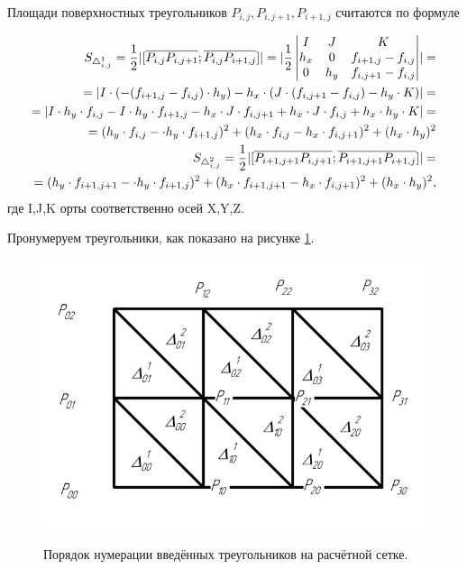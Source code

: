 \documentclass{article}
\begin{document}
Площади поверхностных треугольников $P_{i,j}, P_{i,j+1}, P_{i+1,j}$ считаются по формуле 

\begin{align}\label{eq:triangle_square}
S_{\triangle_{i,j}^1} = \frac{1}{2} \lvert [\overline{P_{i,j}P_{i,j+1}};\overline{P_{i,j}P_{i+1,j}}] \rvert = \lvert \frac{1}{2} 
\begin{vmatrix}
  I & J & K \\
  h_x & 0 & f_{i+1,j}-f_{i,j} \\
  0 & h_y & f_{i,j+1}-f_{i,j}
\end{vmatrix}
\rvert
= \notag \\
= \lvert I \cdot (-(f_{i+1,j}-f_{i,j}) \cdot h_y) - h_x \cdot (J \cdot (f_{i,j+1}-f_{i,j}) - h_y \cdot K) \rvert = \notag \\
= \lvert I \cdot h_y \cdot f_{i,j} -I \cdot h_y \cdot f_{i+1,j} - h_x \cdot J \cdot f_{i,j+1}+ h_x \cdot J \cdot f_{i,j} + h_x \cdot h_y \cdot K \rvert = \notag \\
= (h_y \cdot f_{i,j} - \cdot h_y \cdot f_{i+1,j})^2 + (h_x \cdot f_{i,j} - h_x \cdot f_{i,j+1})^2 + (h_x \cdot h_y)^2 \\
S_{\triangle_{i,j}^2} = \frac{1}{2} \lvert [\overline{P_{i+1,j+1}P_{i,j+1}};\overline{P_{i+1,j+1}P_{i+1,j}}] \rvert = \notag \\
= (h_y \cdot f_{i+1,j+1} - \cdot h_y \cdot f_{i+1,j})^2 + (h_x \cdot f_{i+1,j+1} - h_x \cdot f_{i,j+1})^2 + (h_x \cdot h_y)^2,
\end{align}
где I,J,K орты соответственно осей X,Y,Z.

Пронумеруем треугольники, как показано на рисунке \ref{fig:triangle_numeration}.

\begin{figure}[H]
\centering
\includegraphics[width=0.8\linewidth]{triangle_numeration.png}
\caption{}
\label{fig:triangle_numeration}
Порядок нумерации введённых треугольников на расчётной сетке.
\end{figure}
\end{document}
